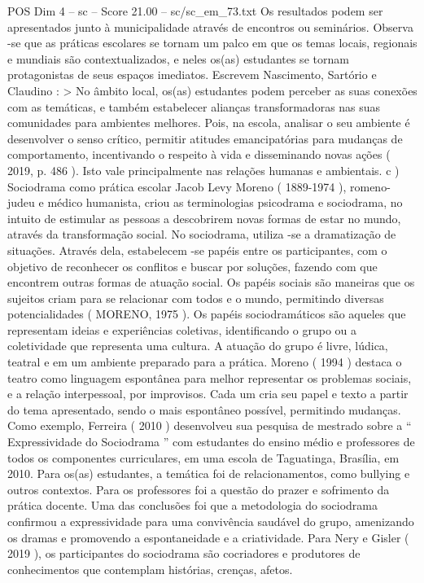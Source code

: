 \begin{textsample}{POS Dim 4 – sc – Score 21.00 – sc/sc\_em\_73.txt}
Os resultados podem ser apresentados junto à municipalidade através de encontros ou seminários.
Observa -se que as práticas escolares se tornam um palco em que os temas locais, regionais e mundiais são contextualizados, e neles os(as) estudantes se tornam protagonistas de seus espaços imediatos.
Escrevem Nascimento, Sartório e Claudino : > No âmbito local, os(as) estudantes podem perceber as suas conexões com as temáticas, e também estabelecer alianças transformadoras nas suas comunidades para ambientes melhores.
Pois, na escola, analisar o seu ambiente é desenvolver o senso crítico, permitir atitudes emancipatórias para mudanças de comportamento, incentivando o respeito à vida e disseminando novas ações ( 2019, p. 486 ).
Isto vale principalmente nas relações humanas e ambientais. c ) Sociodrama como prática escolar Jacob Levy Moreno ( 1889-1974 ), romeno-judeu e médico humanista, criou as terminologias psicodrama e sociodrama, no intuito de estimular as pessoas a descobrirem novas formas de estar no mundo, através da transformação social.
No sociodrama, utiliza -se a dramatização de situações.
Através dela, estabelecem -se papéis entre os participantes, com o objetivo de reconhecer os conflitos e buscar por soluções, fazendo com que encontrem outras formas de atuação social.
Os papéis sociais são maneiras que os sujeitos criam para se relacionar com todos e o mundo, permitindo diversas potencialidades ( MORENO, 1975 ).
Os papéis sociodramáticos são aqueles que representam ideias e experiências coletivas, identificando o grupo ou a coletividade que representa uma cultura.
A atuação do grupo é livre, lúdica, teatral e em um ambiente preparado para a prática.
Moreno ( 1994 ) destaca o teatro como linguagem espontânea para melhor representar os problemas sociais, e a relação interpessoal, por improvisos.
Cada um cria seu papel e texto a partir do tema apresentado, sendo o mais espontâneo possível, permitindo mudanças.
Como exemplo, Ferreira ( 2010 ) desenvolveu sua pesquisa de mestrado sobre a “ Expressividade do Sociodrama ” com estudantes do ensino médio e professores de todos os componentes curriculares, em uma escola de Taguatinga, Brasília, em 2010.
Para os(as) estudantes, a temática foi de relacionamentos, como bullying e outros contextos.
Para os professores foi a questão do prazer e sofrimento da prática docente.
Uma das conclusões foi que a metodologia do sociodrama confirmou a expressividade para uma convivência saudável do grupo, amenizando os dramas e promovendo a espontaneidade e a criatividade.
Para Nery e Gisler ( 2019 ), os participantes do sociodrama são cocriadores e produtores de conhecimentos que contemplam histórias, crenças, afetos.

\end{textsample}
